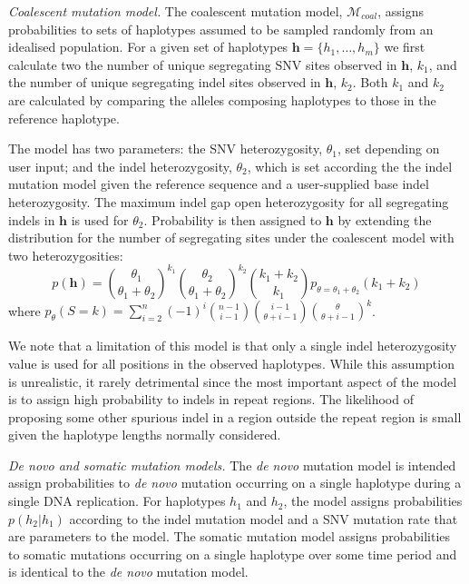 \documentclass[notitlepage, twocolumn, 10pt]{article}
\begin{document}
\vspace{3mm}
\noindent\emph{Coalescent mutation model.} The coalescent mutation model, $\mathcal{M}_{coal}$, assigns probabilities to sets of haplotypes assumed to be sampled randomly from an idealised population. For a given set of haplotypes ${\boldsymbol{h} = \{h_1, \dots, h_m\}}$ we first calculate two the number of unique segregating SNV sites observed in $\boldsymbol{h}$, $k_1$, and the number of unique segregating indel sites observed in $\boldsymbol{h}$,  $k_2$. Both $k_1$ and $k_2$ are calculated by comparing the alleles composing haplotypes to those in the reference haplotype. 

The model has two parameters: the SNV heterozygosity, $\theta_1$, set depending on user input; and the indel heterozygosity, $\theta_2$, which is set according the the indel mutation model given the reference sequence and a user-supplied base indel heterozygosity. The maximum indel gap open heterozygosity for all segregating indels in $\boldsymbol{h}$ is used for $\theta_2$. Probability is then assigned to $\boldsymbol{h}$ by extending the distribution for the number of segregating sites under the coalescent model \cite{RN622} with two heterozygosities:
\begin{equation*}
    p(\boldsymbol{h}) = \binom{\theta_1}{\theta_1 + \theta_2}^{k_1} \binom{\theta_2}{\theta_1 + \theta_2}^{k_2} \binom{k_1 + k_2}{k_1} p_{\theta = \theta_1 + \theta_2} (k_1 + k_2)
\end{equation*}
where $p_\theta(S = k) = \sum_{i=2}^n (-1)^i \binom{n - 1}{i - 1} \binom{i - 1}{\theta + i - 1} \binom{\theta}{\theta + i - 1}^k$.

We note that a limitation of this model is that only a single indel heterozygosity value is used for all positions in the observed haplotypes. While this assumption is unrealistic, it rarely detrimental since the most important aspect of the model is to assign high probability to indels in repeat regions. The likelihood of proposing some other spurious indel in a region outside the repeat region is small given the haplotype lengths normally considered.

\vspace{3mm}
\noindent\emph{De novo and somatic mutation models.} The \textit{de novo} mutation model is intended assign probabilities to \textit{de novo} mutation occurring on a single haplotype during a single DNA replication. For haplotypes $h_1$ and $h_2$, the model assigns probabilities $p(h_2 | h_1)$ according to the indel mutation model and a SNV mutation rate that are parameters to the model. The somatic mutation model assigns probabilities to somatic mutations occurring on a single haplotype over some time period and is identical to the \textit{de novo} mutation model.
\end{document}
